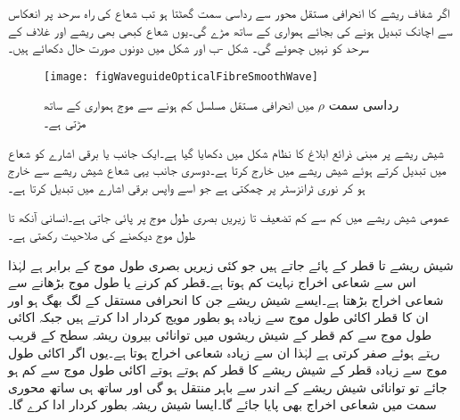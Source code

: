 اگر شفاف ریشے کا انحرافی مستقل محور سے رداسی  سمت گھٹتا ہو تب شعاع کی راہ سرحد پر انعکاس سے اچانک تبدیل ہونے کی بجائے ہمواری کے ساتھ مڑے گی۔یوں شعاع کبھی بھی ریشے اور  غلاف کے سرحد کو نہیں چھوئے گی۔  شکل -ب اور شکل  میں دونوں صورت حال دکھائے ہیں۔  

\begin{figure}
\centering
\texttt{[image: figWaveguideOpticalFibreSmoothWave]}
\caption{رداسی سمت $\rho$ میں انحرافی مستقل مسلسل کم ہونے سے موج ہمواری کے ساتھ مڑتی ہے۔}
\label{شکل_مویج_شیش_ریشہ_ہموار_موج}
\end{figure}

شیش ریشے پر مبنی ذرائع ابلاغ کا نظام شکل میں دکھایا گیا ہے۔ایک جانب  یا  برقی اشارے کو شعاع میں تبدیل کرتے ہوئے شیش ریشے میں خارج کرتا ہے۔دوسری جانب یہی شعاع شیش ریشے سے خارج ہو کر نوری ٹرانزسٹر پر چمکتی ہے جو اسے واپس برقی اشارے میں تبدیل کرتا ہے۔ 

عمومی شیش ریشے  میں کم سے کم تضعیف  تا  زیریں بصری طول موج پر پائی جاتی ہے۔انسانی آنکھ  تا  طول موج دیکھنے کی صلاحیت رکھتی ہے۔

شیش ریشے   تا  قطر کے پائے جاتے ہیں جو کئی زیریں بصری طول موج کے برابر ہے لہٰذا اس سے شعاعی اخراج نہایت کم ہوتا ہے۔قطر کم کرنے یا طول موج بڑھانے سے شعاعی اخراج بڑھتا ہے۔ایسے شیش ریشے جن کا انحرافی مستقل  کے لگ بھگ ہو اور ان کا قطر اکائی طول موج سے زیادہ ہو بطور مویج کردار ادا کرتے ہیں جبکہ اکائی طول موج سے کم قطر  کے شیش ریشوں میں توانائی بیرون ریشہ سطح کے قریب رہتے ہوئے صفر کرتی ہے لہٰذا ان سے زیادہ شعاعی اخراج ہوتا ہے۔یوں اگر اکائی طول موج  سے زیادہ قطر کے شیش ریشے کا قطر کم ہوتے ہوتے اکائی طول موج سے کم ہو جائے تو توانائی شیش ریشے کے اندر سے  باہر  منتقل ہو گی  اور ساتھ ہی ساتھ محوری سمت میں شعاعی اخراج بھی پایا جائے گا۔ایسا شیش ریشہ بطور   کردار ادا کرے  گا۔

